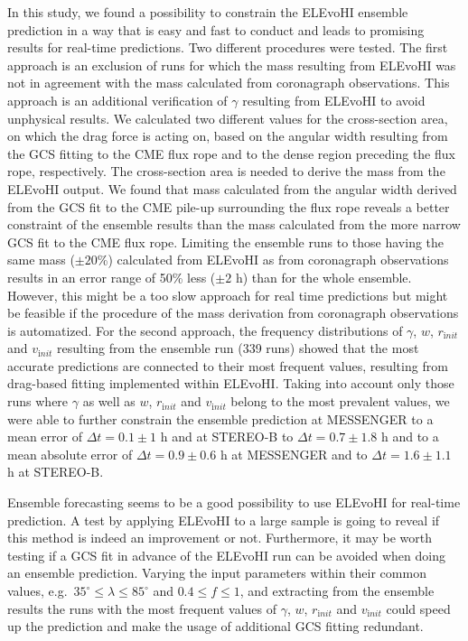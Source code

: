 \documentclass[draft]{agujournal}
\begin{document}
In this study, we found a possibility to constrain the ELEvoHI ensemble prediction in a way that is easy and fast to conduct and leads to promising results for real-time predictions. Two different procedures were tested. The first approach is an exclusion of runs for which the mass resulting from ELEvoHI was not in agreement with the mass calculated from coronagraph observations. This approach is an additional verification of $\gamma$ resulting from ELEvoHI to avoid unphysical results. 
We calculated two different values for the cross-section area, on which the drag force is acting on, based on the angular width resulting from the GCS fitting to the CME flux rope and to the dense region preceding the flux rope, respectively. The cross-section area is needed to derive the mass from the ELEvoHI output. We found that mass calculated from the angular width derived from the GCS fit to the CME pile-up surrounding the flux rope reveals a better constraint of the ensemble results than the mass calculated from the more narrow GCS fit to the CME flux rope. Limiting the ensemble runs to those having the same mass ($\pm 20$\%) calculated from ELEvoHI as from coronagraph observations results in an error range of 50\% less ($\pm 2$ h) than for the whole ensemble. However, this might be a too slow approach for real time predictions but might be feasible if the procedure of the mass derivation from coronagraph observations is automatized.
For the second approach, the frequency distributions of $\gamma$, $w$, $r_{\mathrm init}$ and $v_{\mathrm init}$ resulting from the ensemble run (339 runs) showed that the most accurate predictions are connected to their most frequent values, resulting from drag-based fitting implemented within ELEvoHI. Taking into account only those runs where $\gamma$ as well as $w$, $r_{\mathrm init}$ and $v_{\mathrm init}$ belong to the most prevalent values, we were able to further constrain the ensemble prediction at MESSENGER to a mean error of $\Delta t=0.1 \pm 1$ h and at STEREO-B to $\Delta t=0.7 \pm 1.8$ h and to a mean absolute error of $\Delta t=0.9 \pm 0.6$ h at MESSENGER and to $\Delta t=1.6 \pm 1.1$ h at STEREO-B.

Ensemble forecasting seems to be a good possibility to use ELEvoHI for real-time prediction. A test by applying ELEvoHI to a large sample is going to reveal if this method is indeed an improvement or not. Furthermore, it may be worth testing if a GCS fit in advance of the ELEvoHI run can be avoided when doing an ensemble prediction. Varying the input parameters within their common values, e.g.\ $35^\circ \leq \lambda \leq 85^\circ$ and $0.4 \leq f \leq 1$, and extracting from the ensemble results the runs with the most frequent values of $\gamma$, $w$, $r_{\mathrm init}$ and $v_{\mathrm init}$ could speed up the prediction and make the usage of additional GCS fitting redundant.
\end{document}
